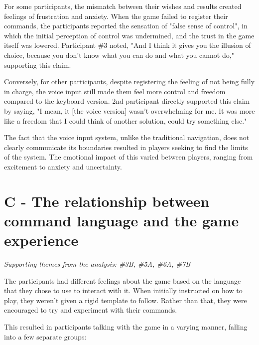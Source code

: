 For some participants, the mismatch between their wishes and results created feelings of frustration and anxiety. 
When the game failed to register their commands, the participants reported the sensation of "false sense of control", in which the initial perception of control was undermined, and the trust in the game itself was lowered. Participant \#3 noted, "And I think it gives you the illusion of choice, because you don't know what you can do and what you cannot do," supporting this claim.

Conversely, for other participants, despite registering the feeling of not being fully in charge, the voice input still made them feel more control and freedom compared to the keyboard version. 2nd participant directly supported this claim by saying, "I mean, it [the voice version] wasn't overwhelming for me. It was more like a freedom that I could think of another solution, could try something else."

The fact that the voice input system, unlike the traditional navigation, does not clearly communicate its boundaries resulted in players seeking to find the limits of the system. The emotional impact of this varied between players, ranging from excitement to anxiety and uncertainty. 


\section{C - The relationship between command language and the game experience}

\textit{Supporting themes from the analysis: \#3B, \#5A, \#6A, \#7B}

The participants had different feelings about the game based on the language that they chose to use to interact with it. When initially instructed on how to play, they weren't given a rigid template to follow. Rather than that, they were encouraged to try and experiment with their commands. 

This resulted in participants talking with the game in a varying manner, falling into a few separate groups:

